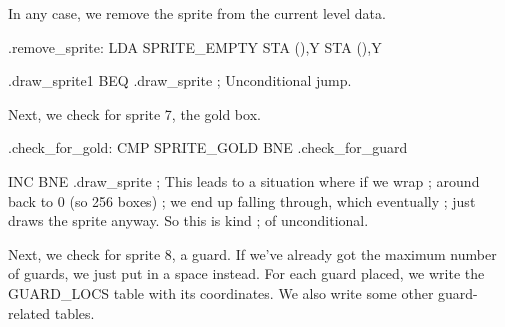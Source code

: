 \documentclass[10pt]{report}%
\begin{document}
In any case, we remove the sprite from the current level data.

\nwenddocs{}\plusendmoddef\nwstartdeflinemarkup{}\nwenddeflinemarkup
.remove_sprite:
    LDA     SPRITE_EMPTY
    STA     (),Y
    STA     (),Y

.draw_sprite1
    BEQ     .draw_sprite        ; Unconditional jump.
\nwendcode{}\nwdocspar

Next, we check for sprite 7, the gold box.

\nwenddocs{}\plusendmoddef\nwstartdeflinemarkup{}\nwenddeflinemarkup
.check_for_gold:
    CMP      SPRITE_GOLD
    BNE     .check_for_guard

    INC     
    BNE     .draw_sprite        ; This leads to a situation where if we wrap
                                ;  around back to 0 (so 256 boxes)
                                ; we end up falling through, which eventually
                                ; just draws the sprite anyway. So this is kind
                                ; of unconditional.

\nwendcode{}\nwdocspar

Next, we check for sprite 8, a guard. If we've already
got the maximum number of guards, we just put in a space instead. For each guard placed, we
write the {\Tt{}GUARD{\_}LOCS\nwendquote} table with its coordinates. We also write some other guard-related
tables.
\end{document}
